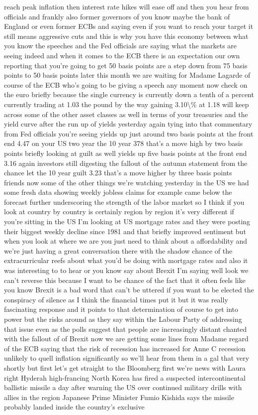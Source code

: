 \documentclass{article}%
\begin{document}
reach peak inflation then interest rate hikes will ease off and then you hear from officials and frankly also former governors of you know maybe the bank of England or even former ECBs and saying even if you want to reach your target it still means aggressive cuts and this is why you have this economy between what you know the speeches and the Fed officials are saying what the markets are seeing indeed and when it comes to the ECB there is an expectation our own reporting that you're going to get 50 basis points are a step down from 75 basis points to 50 basis points later this month we are waiting for Madame Lagarde of course of the ECB who's going to be giving a speech any moment now check on the euro briefly because the single currency is currently down a tenth of a percent currently trading at 1.03 the pound by the way gaining 3.10\textbackslash{}\% at 1.18 will keep across some of the other asset classes as well in terms of your treasuries and the yield curve after the run up of yields yesterday again tying into that commentary from Fed officials you're seeing yields up just around two basis points at the front end 4.47 on your US two year the 10 year 378 that's a move high by two basis points briefly looking at guilt as well yields up five basis points at the front end 3.16 again investors still digesting the fallout of the autumn statement from the chance let the 10 year guilt 3.23 that's a move higher by three basis points friends now some of the other things we're watching yesterday in the US we had some fresh data showing weekly jobless claims for example came below the forecast further underscoring the strength of the labor market so I think if you look at country by country is certainly region by region it's very different if you're sitting in the US I'm looking at US mortgage rates and they were posting their biggest weekly decline since 1981 and that briefly improved sentiment but when you look at where we are you just need to think about a affordability and we're just having a great conversation there with the shadow chance of the extracurricular reefs about what you'd be doing with mortgage rates and also it was interesting to to hear or you know say about Brexit I'm saying well look we can't reverse this because I want to be chance of the fact that it often feels like you know Brexit is a bad word that can't be uttered if you want to be elected the conspiracy of silence as I think the financial times put it but it was really fascinating response and it points to that determination of course to get into power but the risks around as they say within the Labour Party of addressing that issue even as the polls suggest that people are increasingly distant chanted with the fallout of of Brexit now we are getting some lines from Madame regard of the ECB saying that the risk of recession has increased for Anne C recession unlikely to quell inflation significantly so we'll hear from them in a gal that very shortly but first let's get straight to the Bloomberg first we're news with Laura right Hyderah high{-}francing North Korea has fired a suspected intercontinental ballistic missile a day after warning the US over continued military drills with allies in the region Japanese Prime Minister Fumio Kishida says the missile probably landed inside the country's exclusive 
\end{document}
